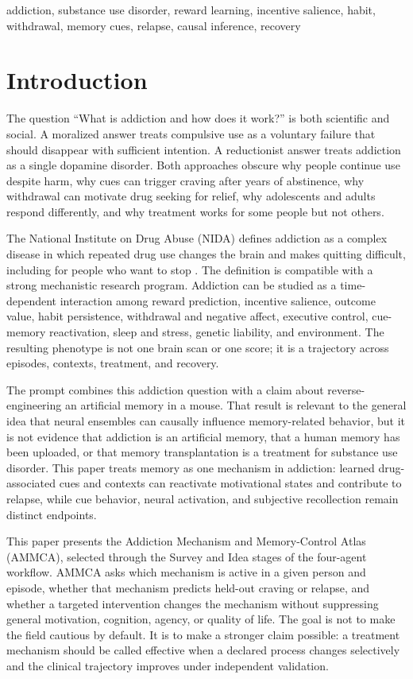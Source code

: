 \documentclass[conference]{IEEEtran}
\begin{document}
\begin{IEEEkeywords}
addiction, substance use disorder, reward learning, incentive salience, habit, withdrawal, memory cues, relapse, causal inference, recovery
\end{IEEEkeywords}

\section{Introduction}
The question ``What is addiction and how does it work?'' is both scientific and social. A moralized answer treats compulsive use as a voluntary failure that should disappear with sufficient intention. A reductionist answer treats addiction as a single dopamine disorder. Both approaches obscure why people continue use despite harm, why cues can trigger craving after years of abstinence, why withdrawal can motivate drug seeking for relief, why adolescents and adults respond differently, and why treatment works for some people but not others.

The National Institute on Drug Abuse (NIDA) defines addiction as a complex disease in which repeated drug use changes the brain and makes quitting difficult, including for people who want to stop \cite{NIDAAddiction,NIDABrain}. The definition is compatible with a strong mechanistic research program. Addiction can be studied as a time-dependent interaction among reward prediction, incentive salience, outcome value, habit persistence, withdrawal and negative affect, executive control, cue-memory reactivation, sleep and stress, genetic liability, and environment. The resulting phenotype is not one brain scan or one score; it is a trajectory across episodes, contexts, treatment, and recovery.

The prompt combines this addiction question with a claim about reverse-engineering an artificial memory in a mouse. That result is relevant to the general idea that neural ensembles can causally influence memory-related behavior, but it is not evidence that addiction is an artificial memory, that a human memory has been uploaded, or that memory transplantation is a treatment for substance use disorder. This paper treats memory as one mechanism in addiction: learned drug-associated cues and contexts can reactivate motivational states and contribute to relapse, while cue behavior, neural activation, and subjective recollection remain distinct endpoints.

This paper presents the Addiction Mechanism and Memory-Control Atlas (AMMCA), selected through the Survey and Idea stages of the four-agent workflow. AMMCA asks which mechanism is active in a given person and episode, whether that mechanism predicts held-out craving or relapse, and whether a targeted intervention changes the mechanism without suppressing general motivation, cognition, agency, or quality of life. The goal is not to make the field cautious by default. It is to make a stronger claim possible: a treatment mechanism should be called effective when a declared process changes selectively and the clinical trajectory improves under independent validation.
\end{document}
